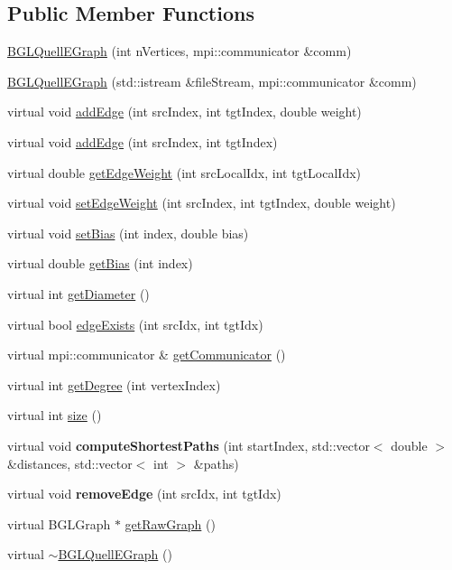 \subsection*{Public Member Functions}
\begin{DoxyCompactItemize}
\item 
\hyperlink{a00026_a092cb3ddac1b9b54893e0c052f268eaf}{B\+G\+L\+Quell\+E\+Graph} (int n\+Vertices, mpi\+::communicator \&comm)
\item 
\hyperlink{a00026_a97ca6c29526536eb48064dd01486c9bd}{B\+G\+L\+Quell\+E\+Graph} (std\+::istream \&file\+Stream, mpi\+::communicator \&comm)
\item 
virtual void \hyperlink{a00026_a2d039fc735fa1afdec68eff073037f60}{add\+Edge} (int src\+Index, int tgt\+Index, double weight)
\item 
virtual void \hyperlink{a00026_acd3e75f0138adbce7e67ce0e755daf9e}{add\+Edge} (int src\+Index, int tgt\+Index)
\item 
virtual double \hyperlink{a00026_a091e3f15fca98364ed98291c29b413e1}{get\+Edge\+Weight} (int src\+Local\+Idx, int tgt\+Local\+Idx)
\item 
virtual void \hyperlink{a00026_a276ac9e0bb24369a0d5211a17020398e}{set\+Edge\+Weight} (int src\+Index, int tgt\+Index, double weight)
\item 
virtual void \hyperlink{a00026_a0412d3e16ba2a84a27b8b050121353f1}{set\+Bias} (int index, double bias)
\item 
virtual double \hyperlink{a00026_a75abe194426ea258e401abb4aaa0a9e1}{get\+Bias} (int index)
\item 
virtual int \hyperlink{a00026_a40de3399ac7ca7a95959359ceb5a135a}{get\+Diameter} ()
\item 
virtual bool \hyperlink{a00026_ab5d9a2cf988e6150a62620546cda3153}{edge\+Exists} (int src\+Idx, int tgt\+Idx)
\item 
virtual mpi\+::communicator \& \hyperlink{a00026_ae0f04cd2431f82446421f7127e60d3c6}{get\+Communicator} ()
\item 
virtual int \hyperlink{a00026_a2b5f52940eadbe2d26cf0923e65b4338}{get\+Degree} (int vertex\+Index)
\item 
virtual int \hyperlink{a00026_a28ca112a3524ae9f7e371c6db3e39485}{size} ()
\item 
virtual void {\bfseries compute\+Shortest\+Paths} (int start\+Index, std\+::vector$<$ double $>$ \&distances, std\+::vector$<$ int $>$ \&paths)\hypertarget{a00026_a02c3683954f510d5a83beb4d8638f9bb}{}\label{a00026_a02c3683954f510d5a83beb4d8638f9bb}

\item 
virtual void {\bfseries remove\+Edge} (int src\+Idx, int tgt\+Idx)\hypertarget{a00026_a1343d67726155e07c018c4e865b3a297}{}\label{a00026_a1343d67726155e07c018c4e865b3a297}

\item 
virtual B\+G\+L\+Graph $\ast$ \hyperlink{a00026_a0e655fce4310baffd51efed981f508fd}{get\+Raw\+Graph} ()
\item 
virtual \hyperlink{a00026_af05274ea2425f3ab8efd1e4ca4fd9307}{$\sim$\+B\+G\+L\+Quell\+E\+Graph} ()
\end{DoxyCompactItemize}

